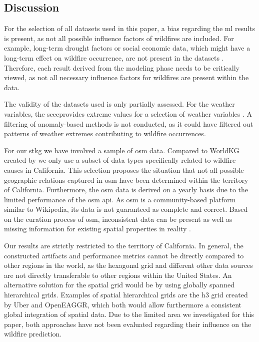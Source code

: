 \documentclass[
]{ceurart}
\begin{document}

\subsection{Discussion} \label{cha:Discussion}
For the selection of all datasets used in this paper, a bias regarding the \gls*{ml} results is present, as not all possible influence factors of wildfires are included. For example, long-term drought factors or social economic data, which might have a long-term effect on wildfire occurrence, are not present in the datasets \cite{Littell.2018}. Therefore, each result derived from the modeling phase needs to be critically viewed, as not all necessary influence factors for wildfires are present within the data. 

The validity of the datasets used is only partially assessed. For the weather variables, the \gls*{scec}provides extreme values for a selection of weather variables \cite{StateClimateExtremesCommittee.2022}. A filtering of anomaly-based methods is not conducted, as it could have filtered out patterns of weather extremes contributing to wildfire occurrences. 

For our \gls*{stkg} we have involved a sample of \gls*{osm} data. Compared to WorldKG created by \cite{Tempelmeier.2021} we only use a subset of data types specifically related to wildfire causes in California. This selection proposes the situation that not all possible geographic relations captured in \gls*{osm} have been determined within the territory of California. Furthermore, the \gls*{osm} data is derived on a yearly basis due to the limited performance of the \gls*{osm} \gls*{api}. As \gls*{osm} is a community-based platform similar to Wikipedia, its data is not guaranteed as complete and correct. Based on the curation process of \gls*{osm}, inconsistent data can be present as well as missing information for existing spatial properties in reality \cite{Basiri.2016}.

Our results are strictly restricted to the territory of California. In general, the constructed artifacts and performance metrics cannot be directly compared to other regions in the world, as the hexagonal grid and different other data sources are not directly transferable to other regions within the United States. An alternative solution for the spatial grid would be by using globally spanned hierarchical grids. Examples of spatial hierarchical grids are the h3 grid created by Uber and OpenEAGGR, which both would allow furthermore a consistent global integration of spatial data. Due to the limited area we investigated for this paper, both approaches have not been evaluated regarding their influence on the wildfire prediction.
\end{document}
